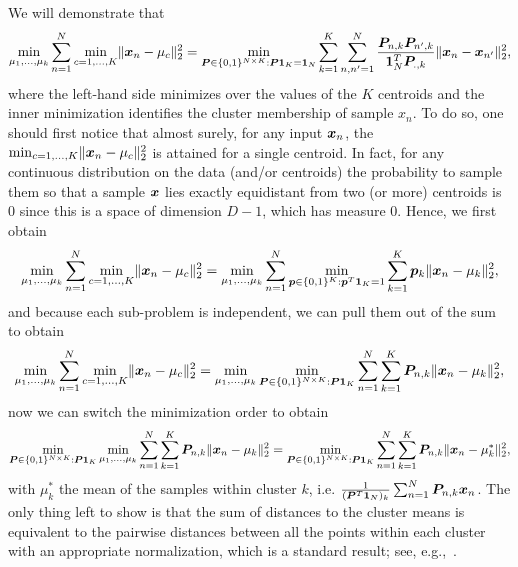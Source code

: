 \documentclass{article} %
\begin{document}
We will demonstrate that 
\begin{align}
    \min_{\mu_1,\dots,\mu_k}\sum_{n=1}^{N}\min_{c=1,\dots,K} \lVert{\bm{x}}_n-\mu_c \rVert^2_2 =\min_{{\bm{P}}\in \{0,1\}^{N \times K}:{\bm{P}}\mathbf{1}_{K}=\mathbf{1}_{N}}\sum_{k=1}^{K}\sum_{n,n^\prime=1}^{N}  \frac{{\bm{P}}_{n,k}{\bm{P}}_{n^\prime,k}}{\mathbf{1}_{N}^T{\bm{P}}_{.,k}}\lVert{\bm{x}}_{n}-{\bm{x}}_{n'} \rVert^2_2,
\end{align}
where the left-hand side minimizes over the values of the $K$ centroids and the inner minimization identifies the cluster membership of sample $x_n$.
To do so, one should first notice that almost surely, for any input ${\bm{x}}_n$, the $\min_{c=1,\dots,K} \lVert{\bm{x}}_n-\mu_c \rVert^2_2$ is attained for a single centroid. In fact, for any continuous distribution on the data (and/or centroids) the probability to sample them so that a sample ${\bm{x}}$ lies exactly equidistant from two (or more) centroids is $0$ since this is a space of dimension $D-1$, which has measure $0$.
Hence, we first obtain
\begin{align*}
    \min_{\mu_1,\dots,\mu_k}\sum_{n=1}^{N}\min_{c=1,\dots,K} \lVert{\bm{x}}_n-\mu_c \rVert^2_2 =\min_{\mu_1,\dots,\mu_k}\sum_{n=1}^{N}\min_{{\bm{p}} \in \{0,1\}^{K}:{\bm{p}}^T\mathbf{1}_K=1}\sum_{k=1}^{K} {\bm{p}}_k\lVert{\bm{x}}_n-\mu_k \rVert^2_2,
\end{align*}
and because each sub-problem is independent, we can pull them out of the sum to obtain
\begin{align*}
    \min_{\mu_1,\dots,\mu_k}\sum_{n=1}^{N}\min_{c=1,\dots,K} \lVert{\bm{x}}_n-\mu_c \rVert^2_2 =\min_{\mu_1,\dots,\mu_k}\min_{{\bm{P}}\in \{0,1\}^{N \times K}:{\bm{P}}\mathbf{1}_{K}}\sum_{n=1}^{N}\sum_{k=1}^{K} {\bm{P}}_{n,k}\lVert{\bm{x}}_n-\mu_k \rVert^2_2,
\end{align*}
now we can switch the minimization order to obtain
\begin{align*}
    \min_{{\bm{P}}\in \{0,1\}^{N \times K}:{\bm{P}}\mathbf{1}_{K}}\min_{\mu_1,\dots,\mu_k}\sum_{n=1}^{N}\sum_{k=1}^{K} {\bm{P}}_{n,k}\lVert{\bm{x}}_n-\mu_k \rVert^2_2=\min_{{\bm{P}}\in \{0,1\}^{N \times K}:{\bm{P}}\mathbf{1}_{K}}\sum_{n=1}^{N}\sum_{k=1}^{K} {\bm{P}}_{n,k}\lVert{\bm{x}}_n-\mu^*_k \rVert^2_2,
\end{align*}
with $\mu^*_k$ the mean of the samples within cluster $k$, i.e. $\frac{1}{({\bm{P}}^T\mathbf{1}_N)_k}\sum_{n=1}^{N}{\bm{P}}_{n,k}{\bm{x}}_n$.
The only thing left to show is that the sum of distances to the cluster means is equivalent to the pairwise distances between all the points within each cluster with an appropriate normalization, which is a standard result; see, e.g.,~\citet{zha2001spectral}.
    
\end{document}
